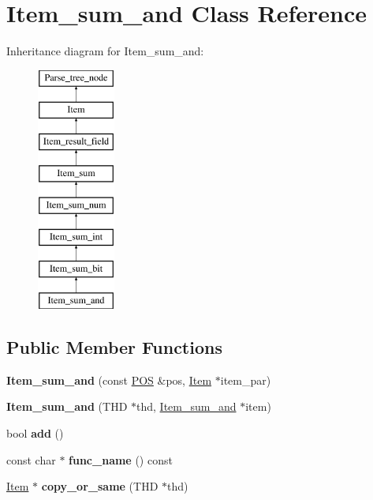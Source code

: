 \hypertarget{classItem__sum__and}{}\section{Item\+\_\+sum\+\_\+and Class Reference}
\label{classItem__sum__and}
Inheritance diagram for Item\+\_\+sum\+\_\+and\+:\begin{figure}[H]
\begin{center}
\leavevmode
\includegraphics[height=8.000000cm]{classItem__sum__and}
\end{center}
\end{figure}
\subsection*{Public Member Functions}
\begin{DoxyCompactItemize}
\item 
\mbox{\label{classItem__sum__and_afab228605810ea6695f1112e51e49682}} 
{\bfseries Item\+\_\+sum\+\_\+and} (const \mbox{\hyperlink{structYYLTYPE}{P\+OS}} \&pos, \mbox{\hyperlink{classItem}{Item}} $\ast$item\+\_\+par)
\item 
\mbox{\label{classItem__sum__and_a67846cc79e4ca64a1a0ee0d4f3e84ffd}} 
{\bfseries Item\+\_\+sum\+\_\+and} (T\+HD $\ast$thd, \mbox{\hyperlink{classItem__sum__and}{Item\+\_\+sum\+\_\+and}} $\ast$item)
\item 
\mbox{\label{classItem__sum__and_adf98e59b294de8c4e2ff8cb7659eb665}} 
bool {\bfseries add} ()
\item 
\mbox{\label{classItem__sum__and_addf112ce7f8e6788da7a3fab143d7242}} 
const char $\ast$ {\bfseries func\+\_\+name} () const
\item 
\mbox{\label{classItem__sum__and_a9306fc8ef424ae46c36823befea0d120}} 
\mbox{\hyperlink{classItem}{Item}} $\ast$ {\bfseries copy\+\_\+or\+\_\+same} (T\+HD $\ast$thd)
\end{DoxyCompactItemize}

